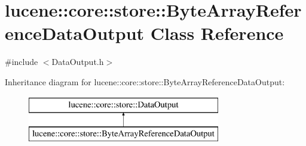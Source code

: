 \hypertarget{classlucene_1_1core_1_1store_1_1ByteArrayReferenceDataOutput}{}\section{lucene\+:\+:core\+:\+:store\+:\+:Byte\+Array\+Reference\+Data\+Output Class Reference}
\label{classlucene_1_1core_1_1store_1_1ByteArrayReferenceDataOutput}


{\ttfamily \#include $<$Data\+Output.\+h$>$}

Inheritance diagram for lucene\+:\+:core\+:\+:store\+:\+:Byte\+Array\+Reference\+Data\+Output\+:\begin{figure}[H]
\begin{center}
\leavevmode
\includegraphics[height=2.000000cm]{classlucene_1_1core_1_1store_1_1ByteArrayReferenceDataOutput}
\end{center}
\end{figure}
